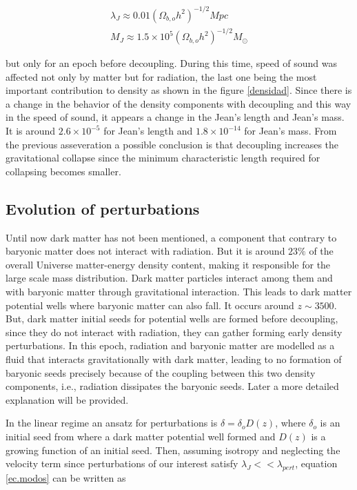 \begin{eqnarray*}
\lambda_J \approx 0.01(\Omega_{b,o}h^2)^{-1/2}Mpc\\
M_J \approx 1.5\times 10^5 (\Omega_{b,o}h^2)^{-1/2}M_{\odot}
\end{eqnarray*}

but only for an epoch before decoupling. During this time, 
speed of sound was affected not only by matter but for radiation, 
the last one being the most important contribution to density as 
shown in the figure \ref{densidad}. 
Since there is a change in the 
behavior of the density components with decoupling and this way in the
speed of sound, it appears a change in the Jean's length and Jean's mass.
It is around $2.6\times 10^{-5}$ for Jean's length  and $1.8\times 10^{-14}$
for Jean's mass. 
From the previous asseveration a possible conclusion is that
decoupling increases the gravitational collapse since the minimum characteristic length
required for collapsing becomes smaller.

\subsection{ Evolution of perturbations }

Until now dark matter has not been mentioned, a component that contrary
to baryonic matter does not interact with radiation. But it is around
$23\%$ of the overall Universe matter-energy density content, making it responsible for the 
large scale mass distribution. Dark matter particles interact
among them and with baryonic matter through gravitational interaction.
This leads to dark matter potential wells where baryonic matter can also fall.  
It occurs around $z \sim 3500$. But, dark matter initial seeds for potential 
wells are formed before decoupling, since they do not interact with radiation,
they can gather forming early density perturbations. In this epoch, radiation
and baryonic matter are modelled as a fluid that interacts gravitationally with 
dark matter, leading to no formation of baryonic seeds precisely because of the 
coupling between this two density components, i.e., radiation dissipates the baryonic
seeds.
Later a more detailed explanation will be provided. 

In the linear regime an ansatz for perturbations is $\delta = \delta_oD(z)$,
where $\delta_o$ is an initial seed from where a dark matter potential well formed
and $D(z)$ is a growing function of an initial seed.
Then, assuming isotropy and neglecting the velocity term since perturbations of our
interest satisfy $\lambda_J << \lambda_{pert}$, equation \ref{ec.modos} can be written
as


